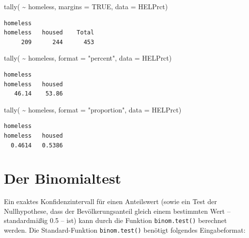 \documentclass[
  ngerman,
]{scrbook}
\newenvironment{Shaded}{\begin{snugshade}}{\end{snugshade}}
\newcommand{\AttributeTok}[1]{\textcolor[rgb]{0.77,0.63,0.00}{#1}}
\newcommand{\ConstantTok}[1]{\textcolor[rgb]{0.00,0.00,0.00}{#1}}
\newcommand{\FunctionTok}[1]{\textcolor[rgb]{0.00,0.00,0.00}{#1}}
\newcommand{\NormalTok}[1]{#1}
\newcommand{\SpecialCharTok}[1]{\textcolor[rgb]{0.00,0.00,0.00}{#1}}
\newcommand{\StringTok}[1]{\textcolor[rgb]{0.31,0.60,0.02}{#1}}
\begin{document}
\begin{Shaded}
\begin{Highlighting}[]
\FunctionTok{tally}\NormalTok{( }\SpecialCharTok{\textasciitilde{}}\NormalTok{ homeless, }\AttributeTok{margins =} \ConstantTok{TRUE}\NormalTok{, }
       \AttributeTok{data =}\NormalTok{ HELPrct)}
\end{Highlighting}
\end{Shaded}

\begin{verbatim}
homeless
homeless   housed    Total 
     209      244      453 
\end{verbatim}

\begin{Shaded}
\begin{Highlighting}[]
\FunctionTok{tally}\NormalTok{( }\SpecialCharTok{\textasciitilde{}}\NormalTok{ homeless, }\AttributeTok{format =} \StringTok{"percent"}\NormalTok{, }
       \AttributeTok{data =}\NormalTok{ HELPrct)}
\end{Highlighting}
\end{Shaded}

\begin{verbatim}
homeless
homeless   housed 
   46.14    53.86 
\end{verbatim}

\begin{Shaded}
\begin{Highlighting}[]
\FunctionTok{tally}\NormalTok{( }\SpecialCharTok{\textasciitilde{}}\NormalTok{ homeless, }\AttributeTok{format =} \StringTok{"proportion"}\NormalTok{, }
       \AttributeTok{data =}\NormalTok{ HELPrct)}
\end{Highlighting}
\end{Shaded}

\begin{verbatim}
homeless
homeless   housed 
  0.4614   0.5386 
\end{verbatim}

\hypertarget{der-binomialtest}{%
\section{Der Binomialtest}\label{der-binomialtest}}

Ein exaktes Konfidenzintervall für einen Anteilswert (sowie ein Test der Nullhypothese, dass der Bevölkerungsanteil gleich einem bestimmten Wert -- standardmäßig 0.5 -- ist) kann durch die Funktion \texttt{binom.test()} berechnet werden. Die Standard-Funktion \texttt{binom.test()} benötigt folgendes Eingabeformat:
\end{document}
